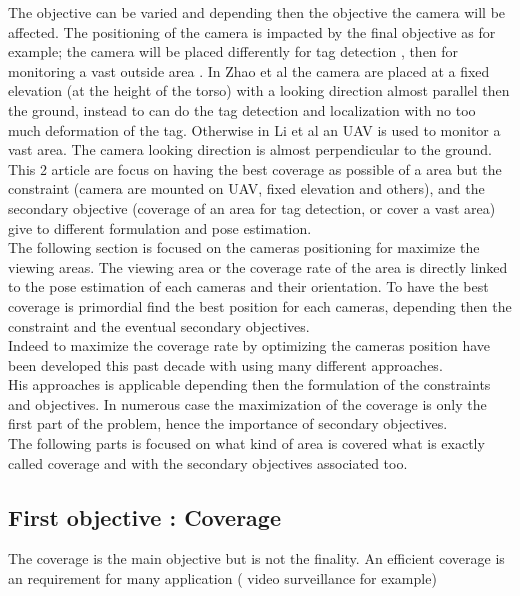 The objective can be varied and depending then the objective the camera will be affected.
The positioning of the camera is impacted by the final objective as for example; the camera will be placed differently for tag detection \cite{22*zhao2008}, then for monitoring a vast outside area \cite{146*li2011}.  In Zhao et al \cite{22*zhao2008} the camera are placed at a fixed elevation (at the height of the torso) with a looking  direction almost parallel then the ground, instead to can do the tag detection and localization with no too much deformation of the tag. Otherwise in Li et al \cite{146*li2011} an UAV is used to monitor a vast area. The camera looking direction is almost perpendicular to the ground. This 2 article are focus on having the best coverage as possible of a area but the constraint (camera are mounted on UAV, fixed elevation and others), and the secondary objective (coverage of an area for tag detection, or cover a vast area) give to different formulation and pose estimation.
\\
The following section is focused on the cameras positioning for maximize the viewing areas. The viewing area or the coverage rate of the area is directly linked to the pose estimation of each cameras and their orientation. To have the best coverage is primordial find the best position for each cameras, depending then the constraint and the eventual secondary objectives.\\
Indeed to maximize the coverage rate by optimizing the cameras position have been developed this past decade with using many different approaches. \\
His approaches is applicable depending then the formulation of the constraints and objectives. In numerous case the maximization of the coverage is only the first part of the problem, hence the importance of secondary objectives.\\
The following parts is focused on what kind of area is covered what is exactly called coverage and with the secondary objectives associated too.

\subsection{First objective : Coverage }

The coverage is the main objective but is not the finality. An efficient coverage is an requirement for many application ( video surveillance  for example) 


